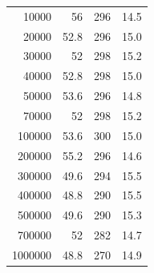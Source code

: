 \documentclass[a4paper,11pt,xelatex,ja=standard]{bxjsarticle}
\begin{document}
\begin{table}[H]
\begin{tabular}{rrrr}
                10000 & 56 & 296 & 14.5 \\
                20000 & 52.8 & 296 & 15.0 \\
                30000 & 52 & 298 & 15.2 \\
                40000 & 52.8 & 298 & 15.0 \\
                50000 & 53.6 & 296 & 14.8 \\
                70000 & 52 & 298 & 15.2 \\
                100000 & 53.6 & 300 & 15.0 \\
                200000 & 55.2 & 296 & 14.6 \\
                300000 & 49.6 & 294 & 15.5 \\
                400000 & 48.8 & 290 & 15.5 \\
                500000 & 49.6 & 290 & 15.3 \\
                700000 & 52 & 282 & 14.7 \\
                1000000 & 48.8 & 270 & 14.9 \\
                \hline
            \end{tabular}
        \end{table}
\end{document}
